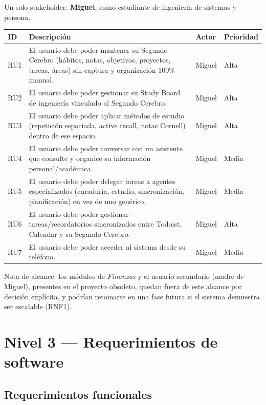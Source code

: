 \documentclass[11pt,a4paper]{article}
\begin{document}
Un solo stakeholder: \textbf{Miguel}, como estudiante de ingeniería de sistemas y persona.

\begin{longtable}{@{}p{1.3cm}p{9.7cm}p{1.8cm}p{1.6cm}@{}}
\toprule
ID & Descripción & Actor & Prioridad \\
\midrule
\endhead
RU1 & El usuario debe poder mantener su Segundo Cerebro (hábitos, notas, objetivos, proyectos, tareas, áreas) sin captura y organización 100\% manual. & Miguel & Alta \\
RU2 & El usuario debe poder gestionar su Study Board de ingeniería vinculado al Segundo Cerebro. & Miguel & Alta \\
RU3 & El usuario debe poder aplicar métodos de estudio (repetición espaciada, active recall, notas Cornell) dentro de ese espacio. & Miguel & Alta \\
RU4 & El usuario debe poder conversar con un asistente que consulte y organice su información personal/académica. & Miguel & Media \\
RU5 & El usuario debe poder delegar tareas a agentes especializados (curaduría, estudio, sincronización, planificación) en vez de uno genérico. & Miguel & Media \\
RU6 & El usuario debe poder gestionar tareas/recordatorios sincronizados entre Todoist, Calendar y su Segundo Cerebro. & Miguel & Alta \\
RU7 & El usuario debe poder acceder al sistema desde su teléfono. & Miguel & Media \\
\bottomrule
\end{longtable}

Nota de alcance: los módulos de \emph{Finanzas} y el usuario secundario (madre de Miguel), presentes en el proyecto obsoleto, quedan fuera de este alcance por decisión explícita, y podrían retomarse en una fase futura si el sistema demuestra ser escalable (RNF1).

\section{Nivel 3 --- Requerimientos de software}

\subsection{Requerimientos funcionales}
\end{document}
